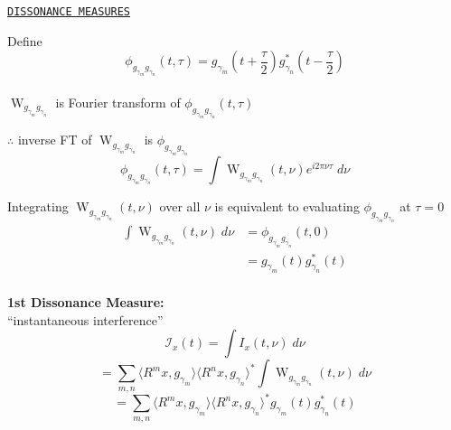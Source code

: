 \documentclass{slides}
\def\W{\operatorname{W}}
\def\halftau{{\scriptstyle \frac{\tau}{2}}}
\begin{document}
\def\tpull{\left(t+\halftau\right)}
\def\tpush{\left(t-\halftau\right)}
\def\I{\mathcal{I}}
\begin{slide}%
\begin{center}{\tt \underline{DISSONANCE MEASURES}}\end{center}
Define
\[
\phi_{g_{\gamma_m}g_{\gamma_n}}(t,\tau) 
= g_{\gamma_m}\tpull g^*_{\gamma_n}\tpush
\]\\
$\W_{g_{\gamma_m}g_{\gamma_n}}$ is Fourier transform
of $\phi_{g_{\gamma_m}g_{\gamma_n}}(t,\tau)$

$\therefore$ inverse FT of $\W_{g_{\gamma_m}g_{\gamma_n}}$ is
$\phi_{g_{\gamma_m}g_{\gamma_n}}$
\\
\[
\phi_{g_{\gamma_m}g_{\gamma_n}}(t,\tau) = \int
\W_{g_{\gamma_m}g_{\gamma_n}}(t,\nu) e^{i2\pi\nu\tau}\;d\nu
\]
\end{slide}

\begin{slide}%
Integrating $\W_{g_{\gamma_m}g_{\gamma_n}}(t,\nu)$ over all $\nu$ is
equivalent to evaluating $\phi_{g_{\gamma_m}g_{\gamma_n}}$ at $\tau = 0$
\begin{align*}
\int
\W_{g_{\gamma_m}g_{\gamma_n}}(t,\nu)\;d\nu
&=\phi_{g_{\gamma_m}g_{\gamma_n}}(t,0)\nonumber \\
&= g_{\gamma_m}(t)g^*_{\gamma_n}(t) %
\end{align*}\\
{\bf 1st Dissonance Measure:} \\
``instantaneous interference''
\[
\I_x(t) = \int I_x(t,\nu)\; d\nu
\]
\[
=\sum_{m, n}
    \langle R^mx,g_{\gamma_m}\rangle \langle R^nx,g_{\gamma_n}\rangle^*
      \int \W_{g_{\gamma_m}g_{\gamma_n}}(t,\nu)\; d\nu
\]
\[
=\sum_{m, n}
    \langle R^mx,g_{\gamma_m}\rangle \langle R^nx,g_{\gamma_n}\rangle^*
g_{\gamma_m}(t)g^*_{\gamma_n}(t)
\]
\end{slide}
\end{document}
